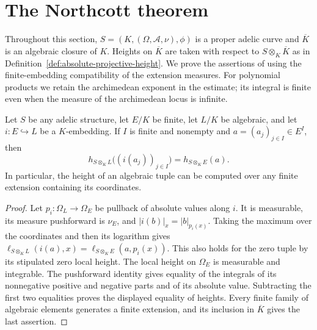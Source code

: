 \section{The Northcott theorem}

Throughout this section, $S=(K,(\Omega,\mathcal A,\nu),\phi)$ is a
proper adelic curve and $\overline K$ is an algebraic closure of $K$.
Heights on $\overline K$ are taken with respect to
$S\otimes_K\overline K$ as in Definition~\ref{def:absolute-projective-height}.
We prove the assertions of \cite[Section 3.5]{chen-moriwaki} using the
finite-embedding compatibility of the extension measures. For polynomial
products we retain the archimedean exponent in the estimate; its integral
is finite even when the measure of the archimedean locus is infinite.

\begin{lemma}
\label{lem:height-finite-embedding}
\leanok
Let $S$ be any adelic structure, let $E/K$ be finite, let $L/K$ be algebraic, and let
$i:E\hookrightarrow L$ be a $K$-embedding. If $I$ is finite and nonempty
and $a=(a_j)_{j\in I}\in E^I$, then
\[
 h_{S\otimes_K L}\bigl((i(a_j))_{j\in I}\bigr)
 =h_{S\otimes_K E}(a).
\]
In particular, the height of an algebraic tuple can be computed over
any finite extension containing its coordinates.
\end{lemma}
\begin{proof}
Let $p_i:\Omega_L\to\Omega_E$ be pullback of absolute values along
$i$. It is measurable, its measure pushforward is $\nu_E$, and
$|i(b)|_x=|b|_{p_i(x)}$. Taking the maximum over the coordinates and
then its logarithm gives
$\ell_{S\otimes_K L}(i(a),x)=\ell_{S\otimes_K E}(a,p_i(x))$.
This also holds for the zero tuple by its stipulated zero local height.
The local height on $\Omega_E$ is measurable and integrable. The
pushforward identity gives equality of the integrals of its nonnegative
positive and negative parts and of its absolute value. Subtracting the
first two equalities proves the displayed equality of heights. Every
finite family of algebraic elements generates a finite extension, and
its inclusion in $\overline K$ gives the last assertion.
\end{proof}


